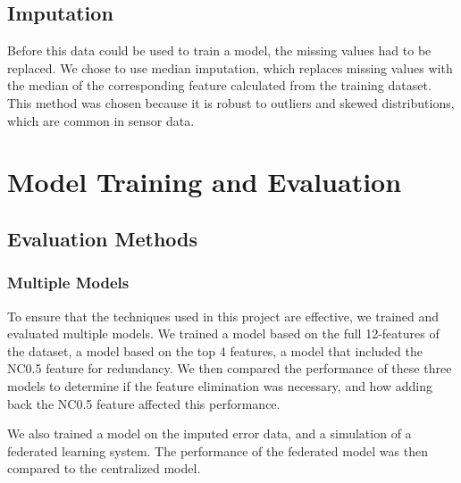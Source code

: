 \documentclass[conference]{IEEEtran}
\begin{document}
\subsection{Imputation}
Before this data could be used to train a model, the missing
values had to be replaced. We chose to use median
imputation, which replaces missing values with the median of
the corresponding feature calculated from the training
dataset. This method was chosen because it is robust to
outliers and skewed distributions, which are common in
sensor data.



\section{Model Training and Evaluation}

\subsection{Evaluation Methods}
\subsubsection{Multiple Models}
To ensure that the techniques used in this project are
effective, we trained and evaluated multiple models. We
trained a model based on the full 12-features of the
dataset, a model based on the top 4 features, a model that
included the NC0.5 feature for redundancy. We then compared
the performance of these three models to determine if the
feature elimination was necessary, and how adding back the
NC0.5 feature affected this performance.

We also trained a model on the imputed error
data, and a simulation of a federated learning system. The
performance of the federated model was then compared to the
centralized model.
\end{document}
